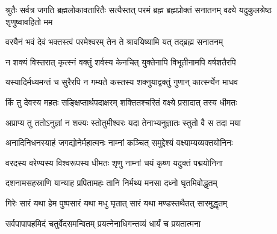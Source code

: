 \threelineshloka
{श्रुतैः सर्वत्र जगति ब्रह्मलोकावतारितैः}
{सत्यैस्तत् परमं ब्रह्म ब्रह्मप्रोक्तं सनातनम्}%
{वक्ष्ये यदुकुलश्रेष्ठ शृणुष्वावहितो मम}%

\twolineshloka
{वरयैनं भवं देवं भक्तस्त्वं परमेश्वरम्}%
{तेन ते श्रावयिष्यामि यत् तद्‌ब्रह्म सनातनम्}%

\twolineshloka
{न शक्यं विस्तरात् कृत्स्नं वक्तुं शर्वस्य केनचित्}%
{युक्तेनापि विभूतीनामपि वर्षशतैरपि}%

\twolineshloka
{यस्यादिर्मध्यमन्तं च सुरैरपि न गम्यते}%
{कस्तस्य शक्नुयाद्वक्तुं गुणान् कार्त्स्न्येन माधव}%

\twolineshloka
{किं तु देवस्य महतः सङ्क्षिप्तार्थपदाक्षरम्}%
{शक्तितश्चरितं वक्ष्ये प्रसादात् तस्य धीमतः}%

\twolineshloka
{अप्राप्य तु ततोऽनुज्ञां न शक्यः स्तोतुमीश्वरः}%
{यदा तेनाभ्यनुज्ञातः स्तुतो वै स तदा मया}%

\twolineshloka
{अनादिनिधनस्याहं जगद्योनेर्महात्मनः}%
{नाम्नां कञ्चित् समुद्देश्यं वक्ष्याम्यव्यक्तयोनिनः}%

\twolineshloka
{वरदस्य वरेण्यस्य विश्वरूपस्य धीमतः}%
{शृणु नाम्नां चयं कृष्ण यदुक्तं पद्मयोनिना}%

\twolineshloka
{दशनामसहस्राणि यान्याह प्रपितामहः}%
{तानि निर्मथ्य मनसा दध्नो घृतमिवोद्धृतम्}%

\twolineshloka
{गिरेः सारं यथा हेम पुष्पसारं यथा मधु}%
{घृतात् सारं यथा मण्डस्तथैतत् सारमुद्धृतम्}%

\twolineshloka
{सर्वपापापहमिदं चतुर्वेदसमन्वितम्}%
{प्रयत्नेनाधिगन्तव्यं धार्यं च प्रयतात्मना}%


